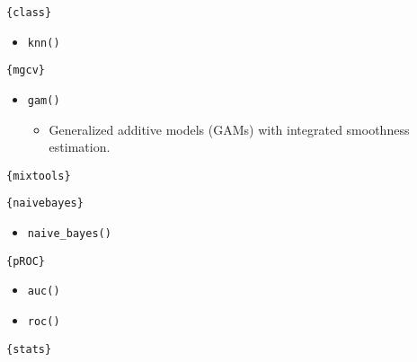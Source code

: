 \documentclass[
]{book}
\providecommand{\tightlist}{%
  \setlength{\itemsep}{0pt}\setlength{\parskip}{0pt}}
\begin{document}
\texttt{\{class\}}

\begin{itemize}
\tightlist
\item
  \texttt{knn()}
\end{itemize}

\texttt{\{mgcv\}}

\begin{itemize}
\tightlist
\item
  \texttt{gam()}

  \begin{itemize}
  \tightlist
  \item
    Generalized additive models (GAMs) with integrated smoothness estimation.
  \end{itemize}
\end{itemize}

\texttt{\{mixtools\}}

\texttt{\{naivebayes\}}

\begin{itemize}
\tightlist
\item
  \texttt{naive\_bayes()}
\end{itemize}

\texttt{\{pROC\}}

\begin{itemize}
\tightlist
\item
  \texttt{auc()}
\item
  \texttt{roc()}
\end{itemize}

\texttt{\{stats\}}
\end{document}

